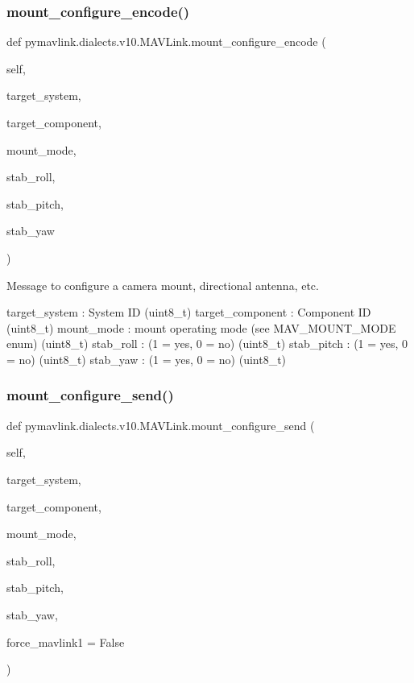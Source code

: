 \begin{DoxyVerb}
\begin{DoxyVerb}
\begin{DoxyVerb}
\begin{DoxyVerb}
\subsubsection{\texorpdfstring{mount\+\_\+configure\+\_\+encode()}{mount\_configure\_encode()}}
{\footnotesize\ttfamily def pymavlink.\+dialects.\+v10.\+M\+A\+V\+Link.\+mount\+\_\+configure\+\_\+encode (\begin{DoxyParamCaption}\item[{}]{self,  }\item[{}]{target\+\_\+system,  }\item[{}]{target\+\_\+component,  }\item[{}]{mount\+\_\+mode,  }\item[{}]{stab\+\_\+roll,  }\item[{}]{stab\+\_\+pitch,  }\item[{}]{stab\+\_\+yaw }\end{DoxyParamCaption})}

\begin{DoxyVerb}Message to configure a camera mount, directional antenna, etc.

target_system             : System ID (uint8_t)
target_component          : Component ID (uint8_t)
mount_mode                : mount operating mode (see MAV_MOUNT_MODE enum) (uint8_t)
stab_roll                 : (1 = yes, 0 = no) (uint8_t)
stab_pitch                : (1 = yes, 0 = no) (uint8_t)
stab_yaw                  : (1 = yes, 0 = no) (uint8_t)\end{DoxyVerb}
 \mbox{\label{classpymavlink_1_1dialects_1_1v10_1_1MAVLink_a144c8293dc8453f12af723b6c0f94dd5}} 
\subsubsection{\texorpdfstring{mount\+\_\+configure\+\_\+send()}{mount\_configure\_send()}}
{\footnotesize\ttfamily def pymavlink.\+dialects.\+v10.\+M\+A\+V\+Link.\+mount\+\_\+configure\+\_\+send (\begin{DoxyParamCaption}\item[{}]{self,  }\item[{}]{target\+\_\+system,  }\item[{}]{target\+\_\+component,  }\item[{}]{mount\+\_\+mode,  }\item[{}]{stab\+\_\+roll,  }\item[{}]{stab\+\_\+pitch,  }\item[{}]{stab\+\_\+yaw,  }\item[{}]{force\+\_\+mavlink1 = {\ttfamily False} }\end{DoxyParamCaption})}


\end{DoxyVerb}
\end{DoxyVerb}
\end{DoxyVerb}
\end{DoxyVerb}
